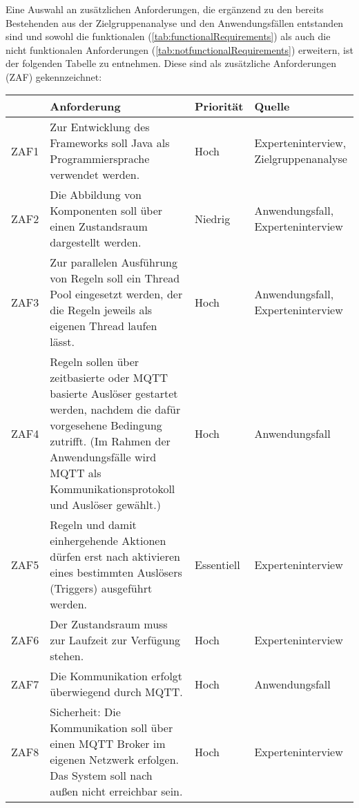 \subsubsection*{}
Eine Auswahl an zusätzlichen Anforderungen, die ergänzend zu den bereits Bestehenden aus der Zielgruppenanalyse und den Anwendungsfällen entstanden sind und sowohl die funktionalen 
(\ref{tab:functionalRequirements}) als auch die nicht funktionalen Anforderungen (\ref{tab:notfunctionalRequirements}) erweitern, ist der folgenden 
Tabelle zu entnehmen. Diese sind als zusätzliche Anforderungen (ZAF) gekennzeichnet: 
\begin{table}[hbt!]
    \begin{center}
        \begin{tabular}{ | p{1.0cm} | p{9.2cm} | p{1.6cm} | p{3.1cm} | }
            \hline
                \textbf{} & \textbf{Anforderung} & \textbf{Priorität} & \textbf{Quelle} \\
            \hline
                ZAF1 & Zur Entwicklung des Frameworks soll Java als Programmiersprache verwendet werden. & Hoch & Experteninterview, Zielgruppenanalyse \\ 
            \hline
                ZAF2 & Die Abbildung von Komponenten soll über einen Zustandsraum dargestellt werden. & Niedrig & Anwendungsfall, Experteninterview \\ 
            \hline
                ZAF3 & Zur parallelen Ausführung von Regeln soll ein Thread Pool eingesetzt werden, der die Regeln jeweils als eigenen Thread laufen lässt. & Hoch & Anwendungsfall, Experteninterview \\ 
            \hline
                ZAF4 & Regeln sollen über zeitbasierte oder MQTT basierte Auslöser gestartet werden, nachdem die dafür vorgesehene Bedingung zutrifft. (Im Rahmen der Anwendungsfälle wird MQTT als Kommunikationsprotokoll und Auslöser gewählt.) & Hoch & Anwendungsfall \\
            \hline
                ZAF5 & Regeln und damit einhergehende Aktionen dürfen erst nach aktivieren eines bestimmten Auslösers (Triggers) ausgeführt werden. & Essentiell & Experteninterview \\
            \hline
                ZAF6 & Der Zustandsraum muss zur Laufzeit zur Verfügung stehen. & Hoch & Experteninterview \\ 
            \hline
                ZAF7 & Die Kommunikation erfolgt überwiegend durch MQTT. & Hoch & Anwendungsfall \\ 
            \hline
                ZAF8 & Sicherheit: Die Kommunikation soll über einen MQTT Broker im eigenen Netzwerk erfolgen. Das System soll nach außen nicht erreichbar sein. & Hoch & Experteninterview \\

\end{tabular}
\end{center}
\end{table}

